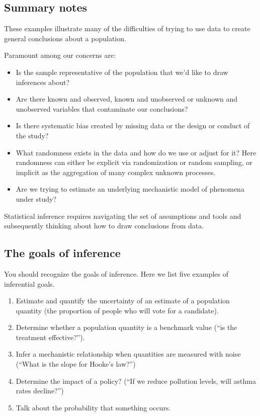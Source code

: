 \documentclass[]{article}
\begin{document}
\subsection{Summary notes}\label{summary-notes}

These examples illustrate many of the difficulties of trying to use data
to create general conclusions about a population.

Paramount among our concerns are:

\begin{itemize}
\itemsep1pt\parskip0pt
\item
  Is the sample representative of the population that we'd like to draw
  inferences about?
\item
  Are there known and observed, known and unobserved or unknown and
  unobserved variables that contaminate our conclusions?
\item
  Is there systematic bias created by missing data or the design or
  conduct of the study?
\item
  What randomness exists in the data and how do we use or adjust for it?
  Here randomness can either be explicit via randomization or random
  sampling, or implicit as the aggregation of many complex unknown
  processes.
\item
  Are we trying to estimate an underlying mechanistic model of phenomena
  under study?
\end{itemize}

Statistical inference requires navigating the set of assumptions and
tools and subsequently thinking about how to draw conclusions from data.

\subsection{The goals of inference}\label{the-goals-of-inference}

You should recognize the goals of inference. Here we list five examples
of inferential goals.

\begin{enumerate}
\def\labelenumi{\arabic{enumi}.}
\itemsep1pt\parskip0pt
\item
  Estimate and quantify the uncertainty of an estimate of a population
  quantity (the proportion of people who will vote for a candidate).
\item
  Determine whether a population quantity is a benchmark value (``is the
  treatment effective?'').
\item
  Infer a mechanistic relationship when quantities are measured with
  noise (``What is the slope for Hooke's law?'')
\item
  Determine the impact of a policy? (``If we reduce pollution levels,
  will asthma rates decline?'')
\item
  Talk about the probability that something occurs.
\end{enumerate}
\end{document}
